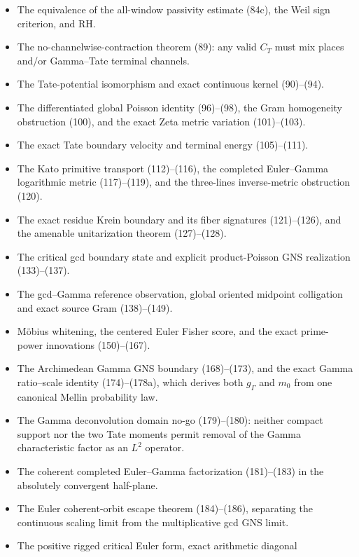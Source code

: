 \documentclass[11pt]{article}
\begin{document}
\begin{itemize}
      contractive; an isometric observation would force $A_T=0$.
\item The equivalence of the all-window passivity estimate (84c), the Weil
      sign criterion, and RH.
\item The no-channelwise-contraction theorem (89): any valid $C_T$ must mix
      places and/or Gamma--Tate terminal channels.
\item The Tate-potential isomorphism and exact continuous kernel
      (90)--(94).
\item The differentiated global Poisson identity (96)--(98), the Gram
      homogeneity obstruction (100), and the exact Zeta metric variation
      (101)--(103).
\item The exact Tate boundary velocity and terminal energy (105)--(111).
\item The Kato primitive transport (112)--(116), the completed
      Euler--Gamma logarithmic metric (117)--(119), and the three-lines
      inverse-metric obstruction (120).
\item The exact residue Krein boundary and its fiber signatures
      (121)--(126), and the amenable unitarization theorem (127)--(128).
\item The critical gcd boundary state and explicit product-Poisson GNS
      realization (133)--(137).
\item The gcd--Gamma reference observation, global oriented midpoint
      colligation and exact source Gram (138)--(149).
\item M\"obius whitening, the centered Euler Fisher score, and the exact
      prime-power innovations (150)--(167).
\item The Archimedean Gamma GNS boundary (168)--(173), and the exact
      Gamma ratio--scale identity (174)--(178a), which derives both
      $g_\Gamma$ and $m_0$ from one canonical Mellin probability law.
\item The Gamma deconvolution domain no-go (179)--(180): neither compact
      support nor the two Tate moments permit removal of the Gamma
      characteristic factor as an $L^2$ operator.
\item The coherent completed Euler--Gamma factorization (181)--(183) in the
      absolutely convergent half-plane.
\item The Euler coherent-orbit escape theorem (184)--(186), separating the
      continuous scaling limit from the multiplicative gcd GNS limit.
\item The positive rigged critical Euler form, exact arithmetic diagonal

\end{itemize}
\end{document}

